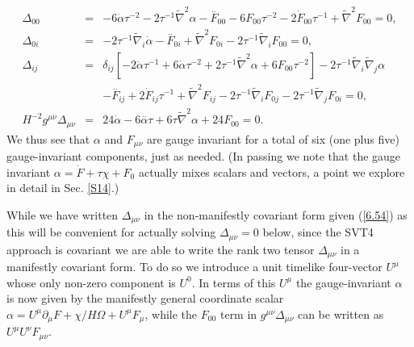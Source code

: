 \documentclass[aps,onecolumn,10pt]{revtex4}
\numberwithin{equation}{section}
\numberwithin{equation}{section}
\begin{document}
\begin{eqnarray}
\Delta_{00}&=& -6 \dot{\alpha} \tau^{-2} - 2 \tau^{-1} \tilde{\nabla}^2\alpha - \overset{..}{F}_{00}  - 6 F_{00} \tau^{-2} - 2 \dot{F}_{00} \tau^{-1} + \tilde{\nabla}^2F_{00}=0,
\nonumber\\ 
\Delta_{0i}&=& -2 \tau^{-1} \tilde{\nabla}_{i}\dot{\alpha}- \overset{..}{F}_{0i} +  \tilde{\nabla}^2F_{0i} - 2 \tau^{-1} \tilde{\nabla}_{i}F_{00}=0,
\nonumber\\ 
\Delta_{ij}&=&\delta_{ij} \left[- 2 \ddot{\alpha}\tau^{-1}+  6 \dot{\alpha} \tau^{-2}  + 2\tau^{-1} \tilde{\nabla}^2\alpha + 6 F_{00} \tau^{-2}\right]-2\tau^{-1} \tilde{\nabla}_{i}\tilde{\nabla}_{j}\alpha
\nonumber\\
&& - \overset{..}{F}_{ij}  + 2 \dot{F}_{ij} \tau^{-1} + \tilde{\nabla}^2F_{ij} -2 \tau^{-1} \tilde{\nabla}_{i}F_{0j} - 2 \tau^{-1} \tilde{\nabla}_{j}F_{0i}=0,
\nonumber\\
H^{-2}g^{\mu\nu}\Delta_{\mu\nu} &=& 24\dot{\alpha} - 6  \overset{..}{\alpha} \tau + 6  \tau \tilde{\nabla}^2\alpha +24 F_{00}=0.
\label{6.54}
\end{eqnarray}
%
We thus see that $\alpha$ and $F_{\mu\nu}$ are gauge invariant for a total of six (one plus five) gauge-invariant components, just as needed. (In passing we note that the gauge invariant  $\alpha=\dot{F}+\tau\chi+F_0$ actually mixes scalars and vectors, a point we explore in detail in Sec. \ref{S14}.)

While we have written $\Delta_{\mu\nu}$ in the non-manifestly covariant form given (\ref{6.54}) as this will be convenient for actually solving $\Delta_{\mu\nu}=0$ below, since the SVT4 approach is covariant we are able to write the rank two  tensor $\Delta_{\mu\nu}$ in a manifestly covariant form. To do so we introduce a unit  timelike four-vector $U^{\mu}$ whose only non-zero component is $U^{0}$. In terms of this $U^{\mu}$ the gauge-invariant $\alpha$ is now given by the manifestly general coordinate scalar $\alpha=U^{\mu}\partial_{\mu}F+\chi/H\Omega+U^{\mu}F_{\mu}$, while the $F_{00}$ term in $g^{\mu\nu}\Delta_{\mu\nu}$ can be written as $U^{\mu}U^{\nu}F_{\mu\nu}$.
 
\end{document}
